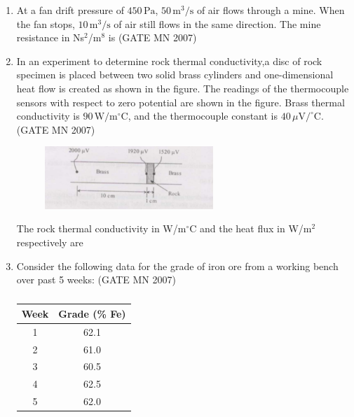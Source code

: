 \documentclass[journal]{IEEEtran}
\begin{document}
\begin{enumerate}
\item At a fan drift pressure of $450\,\text{Pa}$, $50\,\text{m}^3/\text{s}$ of air flows through a mine.  
When the fan stops, $10\,\text{m}^3/\text{s}$ of air still flows in the same direction.  
The mine resistance in Ns$^2$/m$^8$ is
\hfill (GATE MN 2007)
\begin{enumerate}
\end{enumerate}


\item In an experiment to determine rock thermal conductivity,a disc of rock specimen is placed between two solid brass cylinders and one-dimensional heat flow is created as shown in the figure.  
The readings of the thermocouple sensors with respect to zero potential are shown in the figure.  
Brass thermal conductivity is $90\,\text{W/m$^\circ$C}$, and the thermocouple constant is $40\,\mu\text{V}/^\circ$C.  
\hfill (GATE MN 2007)
\begin{figure}[H]
    \centering
    \includegraphics[width=0.6\textwidth]{Screenshot_2025_0812_172517.png}
\caption*{}
    \label{fig:Q56}
\end{figure}

The rock thermal conductivity in W/m$^\circ$C and the heat flux in W/m$^2$ respectively are  
\begin{enumerate}
\end{enumerate}


\item Consider the following data for the grade of iron ore from a working bench over past 5 weeks:
\hfill (GATE MN 2007)
\begin{table}[H]
    \centering\normalsize
\begin{tabular}{|c|c|}
\hline
Week & Grade (\% Fe) \\
\hline
1 & 62.1 \\
\hline
2 & 61.0 \\
\hline
3 & 60.5 \\
\hline
4 & 62.5 \\
\hline
5 & 62.0 \\
\hline
\end{tabular}
   \caption*{}
    \label{tab:Q57}
\end{table}


\end{enumerate}
\end{document}
